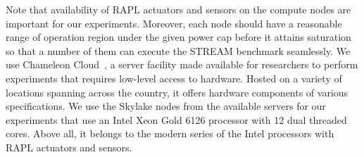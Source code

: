 Note that availability of RAPL actuators and sensors on the compute nodes are important for our experiments. Moreover, each node should have a reasonable range of operation region under the given power cap before it attains saturation so that a number of them can execute the STREAM benchmark seamlessly. We use Chameleon Cloud~\cite{keahey2020lessons}, a server facility made available for researchers to perform experiments that requires low-level access to hardware. Hosted on a variety of locations spanning across the country, it offers hardware components of various specifications. We use the Skylake nodes from the available servers for our experiments that use an Intel Xeon Gold 6126 processor with 12 dual threaded cores. Above all, it belongs to the modern series of the Intel processors with RAPL actuators and sensors. 










